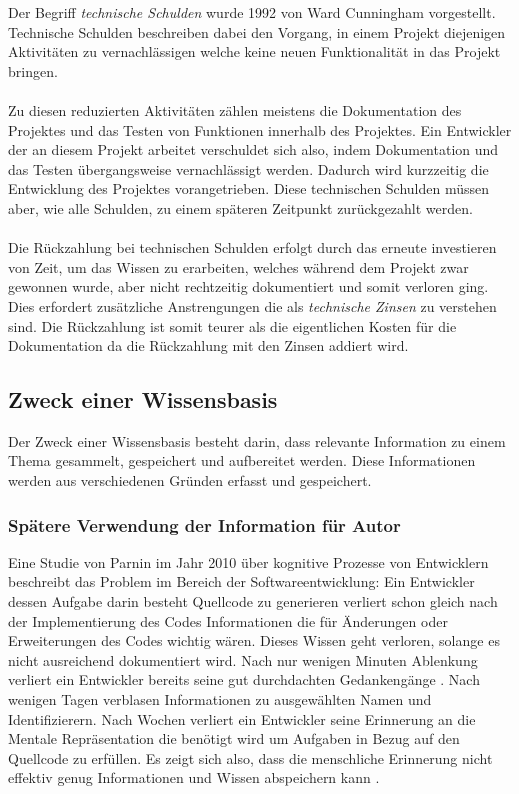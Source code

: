 \documentclass[a4paper,12pt]{scrartcl}
\begin{document}
Der Begriff \textit{technische Schulden} wurde 1992 von Ward Cunningham vorgestellt. Technische Schulden beschreiben dabei den Vorgang, in einem Projekt diejenigen Aktivitäten zu vernachlässigen welche keine neuen Funktionalität in das Projekt bringen. 
\\\\
Zu diesen reduzierten Aktivitäten zählen meistens die Dokumentation des Projektes und das Testen von Funktionen innerhalb des Projektes. Ein Entwickler der an diesem Projekt arbeitet verschuldet sich also, indem Dokumentation und das Testen übergangsweise vernachlässigt werden. Dadurch wird kurzzeitig die Entwicklung des Projektes vorangetrieben. Diese technischen Schulden müssen aber, wie alle Schulden, zu einem späteren Zeitpunkt zurückgezahlt werden. 
\\\\
Die Rückzahlung bei technischen Schulden erfolgt durch das erneute investieren von Zeit, um das Wissen zu erarbeiten, welches während dem Projekt zwar gewonnen wurde, aber nicht rechtzeitig dokumentiert und somit verloren ging. Dies erfordert zusätzliche Anstrengungen die als \textit{technische Zinsen} zu verstehen sind. Die Rückzahlung ist somit teurer als die eigentlichen Kosten für die Dokumentation da die Rückzahlung mit den Zinsen addiert wird.

\subsection{Zweck einer Wissensbasis}
Der Zweck einer Wissensbasis besteht darin, dass relevante Information zu einem Thema gesammelt, gespeichert und aufbereitet werden. Diese Informationen werden aus verschiedenen Gründen erfasst und gespeichert.

\subsubsection{Spätere Verwendung der Information für Autor}
Eine Studie von Parnin im Jahr 2010 \cite{Parnin2010} über kognitive Prozesse von Entwicklern beschreibt das Problem im Bereich der Softwareentwicklung: Ein Entwickler dessen Aufgabe darin besteht Quellcode zu generieren verliert schon gleich nach der Implementierung des Codes Informationen die für Änderungen oder Erweiterungen des Codes wichtig wären. Dieses Wissen geht verloren, solange es nicht ausreichend dokumentiert wird. Nach nur wenigen Minuten Ablenkung verliert ein Entwickler bereits seine gut durchdachten Gedankengänge \cite{Graham2004}. Nach wenigen Tagen verblasen Informationen zu ausgewählten Namen und Identifizierern. Nach Wochen verliert ein Entwickler seine Erinnerung an die Mentale Repräsentation die benötigt wird um Aufgaben in Bezug auf den Quellcode zu erfüllen. Es zeigt sich also, dass die menschliche Erinnerung nicht effektiv genug Informationen und Wissen abspeichern kann \cite{Graham2004}.
\end{document}
